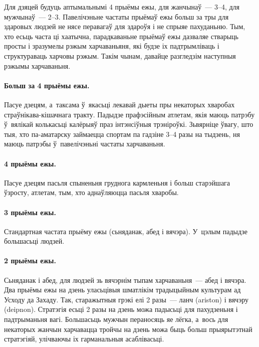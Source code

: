 Для дзяцей будуць аптымальнымі 4 прыёмы ежы, для жанчынаў~--- 3--4, для мужчынаў~--- 2--3. Павелічэньне частаты прыёмаў ежы больш за тры для здаровых людзей не нясе перавагаў для здароўя і не спрыяе пахуданьню. Тым, хто есьць часта ці хаатычна, парадкаваньне прыёмаў ежы дазваляе стварыць просты і зразумелы рэжым харчаваньяня, які будзе іх падтрымліваць і структураваць харчовы рэжым. Такім чынам, давайце разгледзім наступныя рэжымы харчаваньня.

\paragraph{Больш за 4 прыёмы ежы.}
Пасуе дзецям, а~таксама ў~якасьці лекавай дыеты пры некаторых хваробах страўнікава-кішачнага тракту. Падыдзе прафэсійным атлетам, якія маюць патрэбу ў~вялікай колькасьці калёрыяў праз інтэнсіўныя трэніроўкі. Зьвярніце ўвагу, што тыя, хто па-аматарску займаецца спортам па гадзіне 3--4 разы на тыдзень, ня маюць патрэбы ў~павелічэньні частаты харчаваньня.


\paragraph{4 прыёмы ежы.}
Пасуе дзецям пасьля спыненьня груднога кармленьня і больш старэйшага ўзросту, атлетам, тым, хто аднаўляюцца пасьля хваробы.

\paragraph{3 прыёмы ежы.}
Стандартная частата прыёму ежы (сьняданак, абед і вячэра). У~цэлым падыдзе большасьці людзей.

\paragraph{2 прыёмы ежы.}
Сьняданак і абед, для людзей зь вячэрнім тыпам харчаваньня~--- абед і вячэра. Два прыёмы ежы на дзень уласьцівыя шматлікім традыцыйным культурам ад Усходу да Захаду. Так, старажытныя грэкі елі 2 разы~--- ланч (ariston) і вячэру (deipnon). Стратэгія есьці 2 разы на дзень можа падысьці для пахудзеньня і падтрыманьня вагі. Большасьць мужчын пераносяць яе лёгка, а~вось для некаторых жанчын харчавацца тройчы на дзень можа быць больш прыярытэтнай стратэгіяй, улічваючы іх гарманальныя асаблівасьці.

